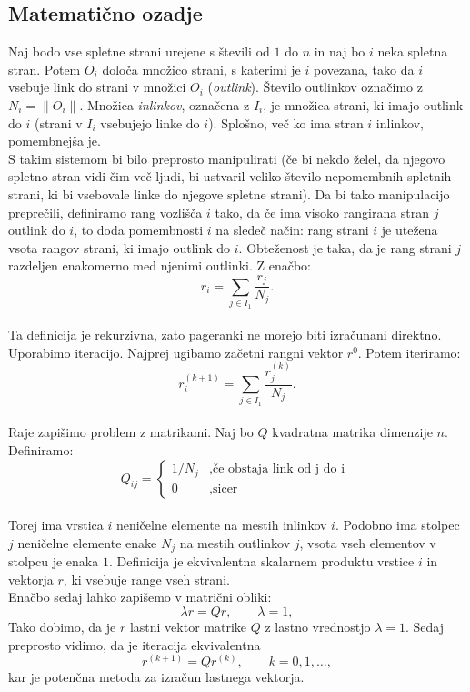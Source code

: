 \documentclass[a4paper]{article}
\begin{document}
\subsection{Matematično ozadje}
Naj bodo vse spletne strani urejene s števili od $1$ do $n$ in naj bo $i$ neka spletna stran. Potem $O_i$ določa množico strani, s katerimi je $i$ povezana, tako da $i$ vsebuje link do strani v množici $O_i$ (\textit{outlink}). Število outlinkov označimo z $N_i = \|O_i\|$. Množica \textit{inlinkov}, označena z $I_i$, je množica strani, ki imajo outlink do $i$ (strani v $I_i$ vsebujejo linke do $i$).
Splošno, več ko ima stran $i$ inlinkov, pomembnejša je. \\ S takim sistemom bi bilo preprosto manipulirati (če bi nekdo želel, da njegovo spletno stran vidi čim več ljudi, bi ustvaril veliko število nepomembnih spletnih strani, ki bi vsebovale linke do njegove spletne strani). Da bi tako manipulacijo preprečili, definiramo rang vozlišča $i$ tako, da če ima visoko rangirana stran $j$ outlink do $i$, to doda pomembnosti $i$ na sledeč način: rang strani $i$ je utežena vsota rangov strani, ki imajo outlink do $i$. Obteženost  je taka, da je rang strani $j$ razdeljen enakomerno med njenimi outlinki. Z enačbo: $$r_i = \sum_{j \in I_1} \frac{r_j}{N_j}.$$ \\
Ta definicija je rekurzivna, zato pageranki ne morejo biti izračunani direktno. Uporabimo iteracijo. Najprej ugibamo začetni rangni vektor $r^0$. Potem iteriramo:
$$r_i^{(k+1)} = \sum_{j \in I_1} \frac{r_j^{(k)}}{N_j}.$$ \\
Raje zapišimo problem z matrikami. Naj bo $Q$ kvadratna matrika dimenzije $n$. Definiramo:
\[
Q_{ij} = 
\left \{
	\begin{array}{ll}
		1/N_j  &, \mbox{če obstaja link od j do i }  \\
		0 &, \mbox{sicer} 
	\end{array}
\right. \]
\\
Torej ima vrstica $i$ neničelne elemente na mestih inlinkov $i$. Podobno ima stolpec $j$ neničelne elemente enake $N_j$ na mestih  outlinkov $j$, vsota vseh elementov v stolpcu je enaka $1$. Definicija je ekvivalentna skalarnem produktu vrstice $i$ in vektorja $r$, ki vsebuje range vseh strani.\\
Enačbo sedaj lahko zapišemo v matrični obliki:
$$ \lambda r = Qr,     \qquad \lambda = 1,$$
Tako dobimo, da je $r$ lastni vektor matrike $Q$ z lastno vrednostjo $\lambda = 1$. Sedaj preprosto vidimo, da je iteracija ekvivalentna
$$r^{(k+1)} = Qr^{(k)},\qquad  k=0,1,… ,$$
kar je potenčna metoda za izračun lastnega vektorja.\\
\end{document}
